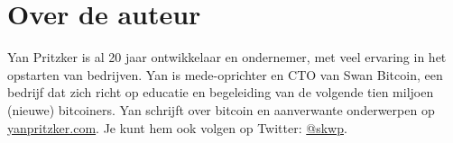\chapter*{Over de auteur}

Yan Pritzker is al 20 jaar ontwikkelaar en ondernemer, met veel ervaring in het opstarten van bedrijven. Yan is mede-oprichter en CTO van Swan Bitcoin, een bedrijf dat zich richt op educatie en begeleiding van de volgende tien miljoen (nieuwe) bitcoiners.
Yan schrijft over bitcoin en aanverwante onderwerpen op \href{https://yanpritzker.com}{yanpritzker.com}. Je kunt hem ook volgen op Twitter: \href{https://twitter.com/skwp}{@skwp}.
